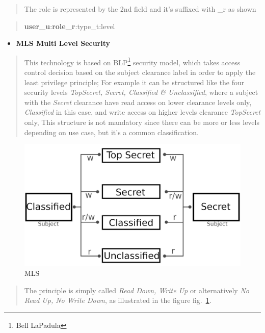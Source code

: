 \documentclass[
  14pt,
  english,
  a4paper,
]{scrreprt}
\providecommand{\tightlist}{%
  \setlength{\itemsep}{0pt}\setlength{\parskip}{0pt}}
\begin{document}
\begin{quote}
The role is represented by the 2nd field and it's suffixed with \_r as
shown
\end{quote}

\begin{quote}
\textbf{user\_u}:\textbf{role\_r}:type\_t:level
\end{quote}

\begin{itemize}
\tightlist
\item
  \textbf{MLS Multi Level Security}
\end{itemize}

\begin{quote}
This technology is based on BLP\footnote{Bell LaPadula} security model,
which takes access control decision based on the subject clearance label
in order to apply the least privilege principle; For example it can be
structured like the four security levels \emph{TopSecret, Secret,
Classified \& Unclassified}, where a subject with the \emph{Secret}
clearance have read access on lower clearance levels only,
\emph{Classified} in this case, and write access on higher levels
clearance \emph{TopSecret} only, This structure is not mandatory since
there can be more or less levels depending on use case, but it's a
common classification.
\end{quote}

\begin{figure}
\hypertarget{fig:lapadula}{%
\centering
\includegraphics{figures/write_up_read_down.png}
\caption{MLS}\label{fig:lapadula}
}
\end{figure}

\begin{quote}
The principle is simply called \emph{Read Down, Write Up} or
alternatively \emph{No Read Up, No Write Down}, as illustrated in the
figure fig.~\ref{fig:lapadula}.
\end{quote}
\end{document}
